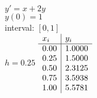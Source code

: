 {
$y' = x+2y$\\
$y(0)=1$\\
interval: $[0,1]$\\
$h=0.25$
}
{
	$\begin{array}{l | l}
		x_i  & y_i    \\ \hline
		0.00    & 1.0000 \\
		0.25 & 1.5000 \\
		0.50  & 2.3125 \\
		0.75 & 3.5938 \\
		1.00  & 5.5781
	\end{array}$
}